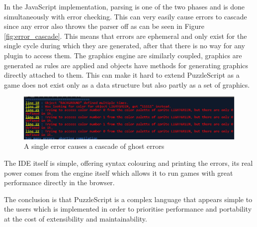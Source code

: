 In the JavaScript implementation, parsing is one of the two phases and is done simultaneously with error checking. This can very easily cause errors to cascade since any error also throws the parser off as can be seen in Figure \ref{fig:error_cascade}. This means that errors are ephemeral and only exist for the single cycle during which they are generated, after that there is no way for any plugin to access them. The graphics engine are similarly coupled, graphics are generated as rules are applied and objects have methods for generating graphics directly attached to them. This can make it hard to extend PuzzleScript as a game does not exist only as a data structure but also partly as a set of graphics.

\begin{figure}[!t]
    \centering
    \includegraphics[width=1\textwidth]{images/Example_errors_current.png}
    \caption{A single error causes a cascade of ghost errors}
    \label{fig:error_cascade_old}
\end{figure}

The IDE itself is simple, offering syntax colouring and printing the errors, its real power comes from the engine itself which allows it to run games with great performance directly in the browser.

The conclusion is that PuzzleScript is a complex language that appears simple to the users which is implemented in order to prioritise performance and portability at the cost of extensibility and maintainability.
